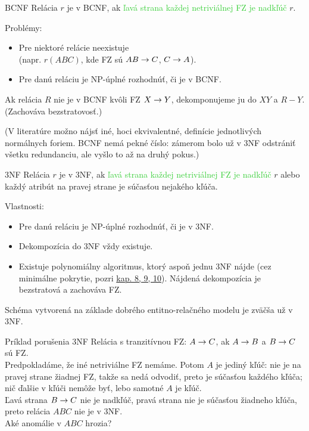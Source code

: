 \documentclass[12pt]{beamer}
\def\green#1{\textcolor{LimeGreen}{#1}}
\begin{document}
\begin{frame}[fragile]{BCNF}
Relácia $r$ je v BCNF, ak \green{ľavá strana každej netriviálnej FZ je nadkľúč} $r$.

\bigskip
Problémy:
\begin{itemize}
\item Pre niektoré relácie neexistuje\\ (napr. $r(ABC)$, kde FZ sú $AB\rightarrow C$, $C\rightarrow A$).
\item Pre danú reláciu je NP-úplné rozhodnúť, či je v BCNF.
\end{itemize}

\bigskip
Ak relácia $R$ nie je v BCNF kvôli FZ $X\rightarrow Y$, dekomponujeme ju do $XY$ a $R-Y$.
(Zachováva bezstratovosť.)

(V literatúre možno nájsť iné, hoci ekvivalentné, definície jednotlivých normálnych foriem.
BCNF nemá pekné číslo: zámerom bolo už v 3NF odstrániť všetku redundanciu,
ale vyšlo to až na druhý pokus.)
\end{frame}

\begin{frame}[fragile]{3NF}
Relácia $r$ je v 3NF, ak \green{ľavá strana každej netriviálnej FZ je nadkľúč} $r$
alebo každý atribút na pravej strane je súčasťou nejakého kľúča.

\bigskip
Vlastnosti:
\begin{itemize}
\item Pre danú reláciu je NP-úplné rozhodnúť, či je v 3NF.
\item Dekompozícia do 3NF vždy existuje.
\item Existuje polynomiálny algoritmus, ktorý aspoň jednu 3NF nájde (cez minimálne pokrytie, pozri
{\scriptsize\href{https://www.inf.usi.ch/faculty/soule/teaching/2016-fall/db/cover.pdf}{kap. 8, 9, 10}}).
Nájdená dekompozícia je bezstratová a zachováva FZ.
\end{itemize}

\bigskip
Schéma vytvorená na základe dobrého entitno-relačného modelu je zväčša už v 3NF.
\end{frame}

\begin{frame}[fragile]{Príklad porušenia 3NF}
Relácia s \alert{tranzitívnou} FZ: $A\rightarrow C$, ak $A\rightarrow B$ a $B\rightarrow C$ sú FZ.\\[5mm]
Predpokladáme, že iné netriviálne FZ nemáme.
Potom $A$ je jediný kľúč: nie je na pravej strane žiadnej FZ,
takže sa nedá odvodiť, preto je súčasťou každého kľúča;
nič ďalšie v kľúči nemôže byť, lebo samotné $A$ je kľúč.\\[5mm]

Ľavá strana $B\rightarrow C$ nie je nadkľúč, pravá strana nie je súčasťou žiadneho kľúča,
preto relácia $ABC$ nie je v 3NF.\\[5mm]

Aké anomálie v $ABC$ hrozia?
\end{frame}
\end{document}

